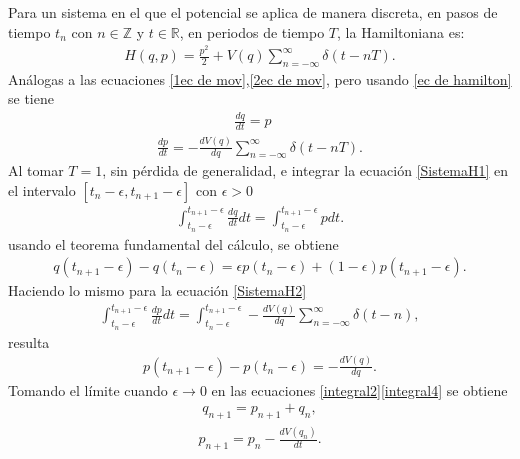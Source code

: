 Para un sistema en el que el potencial se aplica de manera discreta, en pasos de tiempo $t_{n}$ con $n\in\mathbb{Z}$ y $t\in\mathbb{R}$, en periodos de tiempo $T$, la Hamiltoniana es:
\begin{eqnarray}
H(q,p)=\frac{p^{2}}{2}+V(q)\sum_{n=-\infty}^{\infty}\delta(t-nT).
\label{ec de hamilton} 
\end{eqnarray}
Análogas a las ecuaciones \ref{1ec de mov},\ref{2ec de mov}, pero usando \ref{ec de hamilton} se tiene 
\begin{eqnarray}
\frac{dq}{dt}=p\quad
\label{SistemaH1}
\end{eqnarray}
\begin{eqnarray}
\frac{dp}{dt}=-\frac{dV(q)}{dq}\sum_{n=-\infty}^{\infty}\delta(t-nT).
\label{SistemaH2}
\end{eqnarray}
Al tomar $T=1$, sin pérdida de generalidad, e integrar la ecuación \eqref{SistemaH1} en el intervalo $[t_{n}-\epsilon,t_{n+1}-\epsilon]$ con $\epsilon>0$
\begin{eqnarray}
\int_{t_{n}-\epsilon}^{t_{n+1}-\epsilon}\frac{dq}{dt}dt=\int_{t_{n}-\epsilon}^{t_{n+1}-\epsilon}pdt.
\label{integral1}
\end{eqnarray}
usando el teorema fundamental del cálculo, se obtiene
\begin{eqnarray}
q(t_{n+1}-\epsilon)-q(t_{n}-\epsilon)=\epsilon p(t_{n}-\epsilon)+(1-\epsilon)p(t_{n+1}-\epsilon).
\label{integral2}
\end{eqnarray}
Haciendo lo mismo para la ecuación \eqref{SistemaH2}
\begin{eqnarray}
\int_{t_{n}-\epsilon}^{t_{n+1}-\epsilon}\frac{dp}{dt}dt=\int_{t_{n}-\epsilon}^{t_{n+1}-\epsilon}-\frac{dV(q)}{dq}\sum_{n=-\infty}^{\infty}\delta(t-n),
\label{integral3}
\end{eqnarray}
resulta
\begin{eqnarray}
p(t_{n+1}-\epsilon)-p(t_{n}-\epsilon)=-\frac{dV(q)}{dq}.
\label{integral4}
\end{eqnarray}
Tomando el límite cuando $\epsilon\rightarrow 0$ en las ecuaciones \eqref{integral2}\eqref{integral4} se obtiene
\begin{eqnarray}
q_{n+1}=p_{n+1}+q_{n},
\label{sistema hamilton a}
\end{eqnarray}
\begin{eqnarray}
p_{n+1}=p_{n}-\frac{dV(q_{n})}{dt}.
\label{sistema hamilton b}
\end{eqnarray}


